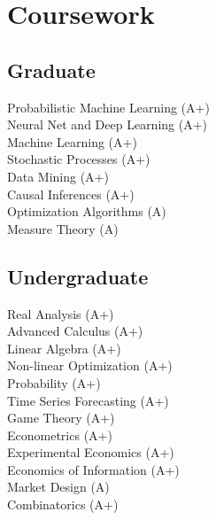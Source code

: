 \documentclass[letterpaper]{deedy-resume} %
\begin{document}
\begin{minipage}[t]{0.33\textwidth}
\sectionspace %


\section{Coursework}

\subsection{Graduate}
Probabilistic Machine Learning (A+)\\%
Neural Net and Deep Learning (A+)\\%
Machine Learning (A+)\\%
Stochastic Processes (A+)\\%
Data Mining (A+)\\%
Causal Inferences (A+) \\
Optimization Algorithms (A) \\
Measure Theory (A) \\

\sectionspace %


\subsection{Undergraduate}

Real Analysis (A+)\\%
Advanced Calculus (A+)\\%
Linear Algebra (A+)\\%
Non-linear Optimization (A+) \\
Probability (A+)\\%
Time Series Forecasting (A+)\\%
Game Theory (A+)\\%
Econometrics (A+)\\%
Experimental Economics (A+)\\%
Economics of Information (A+)\\%
Market Design (A) \\
Combinatorics (A+)\\%


\end{minipage}
\end{document}
